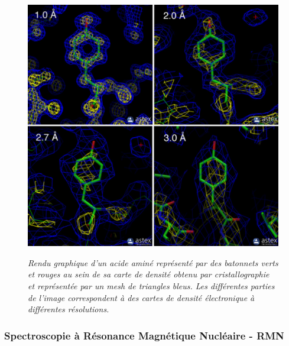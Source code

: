 \begin{figure}
  \centering
  {\includegraphics[width=0.75\linewidth]{./figures/ch1/resolution_xray.pdf}}
    \caption{\it Rendu graphique d'un acide aminé représenté par des batonnets verts et rouges au sein de sa carte de densité obtenu par cristallographie et représentée par un mesh de triangles bleus. Les différentes parties de l'image correspondent à des cartes de densité électronique à différentes résolutions.}
    \label{Fig:resolution_xray}
  \hspace{0.3cm}
\end{figure}

\subsubsection{Spectroscopie à Résonance Magnétique Nucléaire - RMN}

